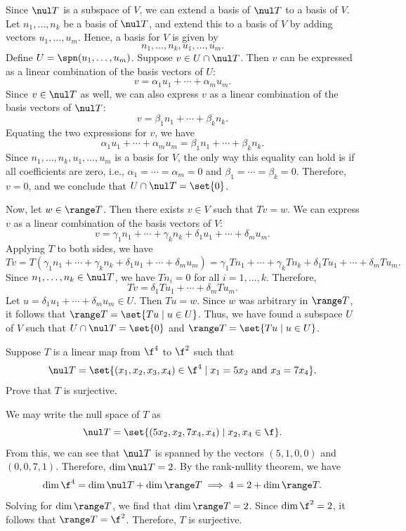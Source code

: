 \begin{sol}
    Since $\nul T$ is a subspace of $V$, we can extend a basis of $\nul T$ to a basis of $V$. Let $n_1, \ldots, n_k$ be a basis of $\nul T$, and extend this to a basis of $V$ by adding vectors $u_1, \ldots, u_m$. Hence, a basis for $V$ is given by
    \[n_1, \ldots, n_k, u_1, \ldots, u_m.\]
    Define $U = \spn(u_1, \ldots, u_m)$. Suppose $v \in U \cap \nul T$. Then $v$ can be expressed as a linear combination of the basis vectors of $U$:
    \[v = \alpha_1 u_1 + \cdots + \alpha_m u_m.\]
    Since $v \in \nul T$ as well, we can also express $v$ as a linear combination of the basis vectors of $\nul T$:
    \[v = \beta_1 n_1 + \cdots + \beta_k n_k.\]
    Equating the two expressions for $v$, we have
    \[\alpha_1 u_1 + \cdots + \alpha_m u_m = \beta_1 n_1 + \cdots + \beta_k n_k.\]
    Since $n_1, \ldots, n_k, u_1, \ldots, u_m$ is a basis for $V$, the only way this equality can hold is if all coefficients are zero, i.e., $\alpha_1 = \cdots = \alpha_m = 0$ and $\beta_1 = \cdots = \beta_k = 0$. Therefore, $v = 0$, and we conclude that $U \cap \nul T = \set{0}$.

    Now, let $w \in \range T$. Then there exists $v \in V$ such that $Tv = w$. We can express $v$ as a linear combination of the basis vectors of $V$:
    \[v = \gamma_1 n_1 + \cdots + \gamma_k n_k + \delta_1 u_1 + \cdots + \delta_m u_m.\]
    Applying $T$ to both sides, we have
    \[Tv = T(\gamma_1 n_1 + \cdots + \gamma_k n_k + \delta_1 u_1 + \cdots + \delta_m u_m) = \gamma_1 Tn_1 + \cdots + \gamma_k Tn_k + \delta_1 Tu_1 + \cdots + \delta_m Tu_m.\]
    Since $n_1, \ldots, n_k \in \nul T$, we have $Tn_i = 0$ for all $i = 1, \ldots, k$. Therefore,
    \[Tv = \delta_1 Tu_1 + \cdots + \delta_m Tu_m.\]
    Let $u = \delta_1 u_1 + \cdots + \delta_m u_m \in U$. Then $Tu = w$. Since $w$ was arbitrary in $\range T$, it follows that $\range T = \set{Tu \mid u \in U}$. Thus, we have found a subspace $U$ of $V$ such that $U \cap \nul T = \set{0}$ and $\range T = \set{Tu \mid u \in U}$.
\end{sol}

\begin{exercise}[3b12]
    Suppose $T$ is a linear map from $\f^4$ to $\f^2$ such that
    \[\nul T = \set{(x_1, x_2, x_3, x_4) \in \f^4 \mid x_1 = 5x_2 \text{ and } x_3 = 7x_4}.\]
    Prove that $T$ is surjective.
\end{exercise}

\begin{sol}
    We may write the null space of $T$ as
    \[\nul T = \set{(5x_2, x_2, 7x_4, x_4) \mid x_2, x_4 \in \f}.\]
    From this, we can see that $\nul T$ is spanned by the vectors $(5, 1, 0, 0)$ and $(0, 0, 7, 1)$. Therefore, $\dim \nul T = 2$. By the rank-nullity theorem, we have
    \[\dim \f^4 = \dim \nul T + \dim \range T \implies 4 = 2 + \dim \range T.\]
    Solving for $\dim \range T$, we find that $\dim \range T = 2$. Since $\dim \f^2 = 2$, it follows that $\range T = \f^2$. Therefore, $T$ is surjective.
\end{sol}

